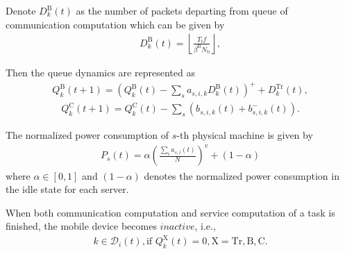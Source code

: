 Denote $D_{k}^{\mathrm{B}}(t)$ as the number of packets departing from queue of communication computation which can be given by
\begin{align}
    D_{k}^{\mathrm{B}}(t)=\left\lfloor\frac{T_{\mathrm{f}}f}{\beta^{\mathrm{B}}N_{\mathrm{b}}}\right\rfloor,
\end{align}

Then the queue dynamics are represented as
\begin{align}
    Q_{k}^{\mathrm{B}}(t+1)=(Q_{k}^{\mathrm{B}}(t)-\sum_{s}a_{s,i,k}D_{k}^{\mathrm{B}}(t))^{+}+D_{k}^{\mathrm{Tr}}(t),
\end{align}
\begin{align}
    Q_{k}^{\mathrm{C}}(t+1)=Q_{k}^{\mathrm{C}}(t)-\sum_{s}(b_{s,i,k}(t)+b_{s,i,k}^{-}(t)).
\end{align}

The normalized power consumption of $s$-th physical machine is given by
\begin{align}
    P_{s}(t)= \alpha\left(\frac{\sum_{i}a_{s,i}(t)}{N}\right)^{v}+(1-\alpha)
\end{align}
where $\alpha\in[0,1]$ and $(1-\alpha)$ denotes the normalized power consumption in the idle state for each server.

When both communication computation and service computation of a task is finished, the mobile device becomes $\textit{inactive}$, i.e.,
\begin{align}
    k\in\mathcal{D}_{i}(t),\text{if }Q_{k}^{\mathrm{X}}(t)=0,\mathrm{X}=\mathrm{Tr},\mathrm{B},\mathrm{C}.
\end{align}